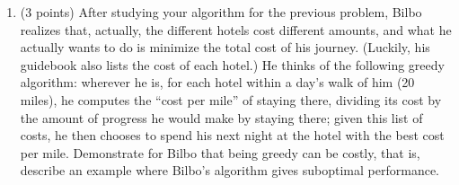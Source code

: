 \documentclass{letter}
\newcommand{\tmstrong}[1]{\textbf{#1}}
\newcommand{\tmtextit}[1]{{\itshape{#1}}}
\newenvironment{enumeratenumeric}{\begin{enumerate}[1.] }{\end{enumerate}}
\newenvironment{itemizedot}{\begin{itemize} \renewcommand{\labelitemi}{$\bullet$}\renewcommand{\labelitemii}{$\bullet$}\renewcommand{\labelitemiii}{$\bullet$}\renewcommand{\labelitemiv}{$\bullet$}}{\end{itemize}}
\newenvironment{itemizeminus}{\begin{itemize} \renewcommand{\labelitemi}{$-$}\renewcommand{\labelitemii}{$-$}\renewcommand{\labelitemiii}{$-$}\renewcommand{\labelitemiv}{$-$}}{\end{itemize}}
\begin{document}
\begin{enumeratenumeric}
\begin{itemizedot}
\begin{itemizeminus}
      \tmtextit{Proof}:
      
      \item {\tmstrong{Claim}}. \tmtextit{FindWay} satisfies the optimality
      criteria that he can finish his journey in the least number of days.
    \end{itemizeminus}
    
    
    
  \end{itemizedot}
  
  
  
  
  \item (3 points) After studying your algorithm for the previous problem,
  Bilbo realizes that, actually, the different hotels cost different amounts,
  and what he actually wants to do is minimize the total cost of his journey.
  (Luckily, his guidebook also lists the cost of each hotel.) He thinks of the
  following greedy algorithm: wherever he is, for each hotel within a day's
  walk of him (20 miles), he computes the ``cost per mile'' of staying there,
  dividing its cost by the amount of progress he would make by staying there;
  given this list of costs, he then chooses to spend his next night at the
  hotel with the best cost per mile. Demonstrate for Bilbo that being greedy
  can be costly, that is, describe an example where Bilbo's algorithm gives
  suboptimal performance.
  

\end{enumeratenumeric}
\end{document}
